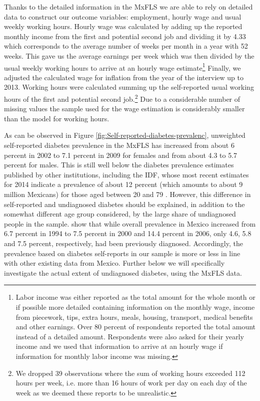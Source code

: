 \documentclass[12pt,english,british]{article}
\begin{document}
Thanks to the detailed information in the \ac{MxFLS} we are able to rely on detailed data to construct our outcome variables: employment, hourly wage and usual weekly working hours. Hourly wage was calculated by adding up the reported monthly
income from the first and potential second job and dividing it by
4.33 which corresponds to the average number of weeks per month in
a year with 52 weeks. This gave us the average earnings per week which
was then divided by the usual weekly working hours to arrive at an
hourly wage estimate\footnote{Labor income was either reported as the total amount for the whole
month or if possible more detailed containing information on the monthly
wage, income from piecework, tips, extra hours, meals, housing, transport,
medical benefits and other earnings. Over 80 percent of respondents
reported the total amount instead of a detailed amount. Respondents
were also asked for their yearly income and we used that information
to arrive at an hourly wage if information for monthly labor income
was missing.} Finally, we adjusted the calculated wage for inflation from the year
of the interview up to 2013. Working hours were calculated summing
up the self-reported usual working hours of the first and potential
second job.\footnote{We dropped 39 observations where the sum of working hours
exceeded 112 hours per week, i.e. more than 16 hours of work per day
on each day of the week as we deemed these reports to be unrealistic.}
Due to a considerable number of missing values the sample used for the wage estimation is considerably smaller than the model for working hours.


As can be observed in Figure \ref{fig:Self-reported-diabetes-prevalenc},
unweighted self-reported diabetes prevalence in the \ac{MxFLS}
has increased from about 6 percent in 2002 to 7.1 percent in 2009
for females and from about 4.3 to 5.7 percent for males. This is
still well below the diabetes prevalence estimates published by other
institutions, including the \ac{IDF}, whose most recent estimates for 2014 indicate a prevalence of about 12 percent (which amounts to about 9 million Mexicans) for those aged between 20 and 79 \citep{InternationalDiabetesFederation2013}.
However, this difference in self-reported and undiagnosed diabetes should be explained, in addition to the somewhat different age group considered, by the large share of undiagnosed people in the sample. \citet{Barquera2013} show that while overall prevalence in Mexico increased from 6.7 percent in 1994 to 7.5 percent in 2000 and 14.4 percent in 2006, only 4.6, 5.8 and 7.5 percent, respectively, had been previously diagnosed. Accordingly, the prevalence based on diabetes self-reports in our sample is more or less in line with other existing data from Mexico. Further below we will specifically investigate the actual extent of undiagnosed diabetes, using the \ac{MxFLS} data.
\end{document}
